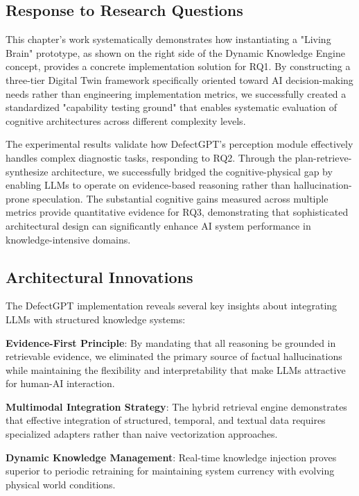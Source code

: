 \subsection{Response to Research Questions}

This chapter's work systematically demonstrates how instantiating a "Living Brain" prototype, as shown on the right side of the Dynamic Knowledge Engine concept, provides a concrete implementation solution for RQ1. By constructing a three-tier Digital Twin framework specifically oriented toward AI decision-making needs rather than engineering implementation metrics, we successfully created a standardized "capability testing ground" that enables systematic evaluation of cognitive architectures across different complexity levels.

The experimental results validate how DefectGPT's perception module effectively handles complex diagnostic tasks, responding to RQ2. Through the plan-retrieve-synthesize architecture, we successfully bridged the cognitive-physical gap by enabling LLMs to operate on evidence-based reasoning rather than hallucination-prone speculation. The substantial cognitive gains measured across multiple metrics provide quantitative evidence for RQ3, demonstrating that sophisticated architectural design can significantly enhance AI system performance in knowledge-intensive domains.

\subsection{Architectural Innovations}

The DefectGPT implementation reveals several key insights about integrating LLMs with structured knowledge systems:

\textbf{Evidence-First Principle}: By mandating that all reasoning be grounded in retrievable evidence, we eliminated the primary source of factual hallucinations while maintaining the flexibility and interpretability that make LLMs attractive for human-AI interaction.

\textbf{Multimodal Integration Strategy}: The hybrid retrieval engine demonstrates that effective integration of structured, temporal, and textual data requires specialized adapters rather than naive vectorization approaches.

\textbf{Dynamic Knowledge Management}: Real-time knowledge injection proves superior to periodic retraining for maintaining system currency with evolving physical world conditions.


